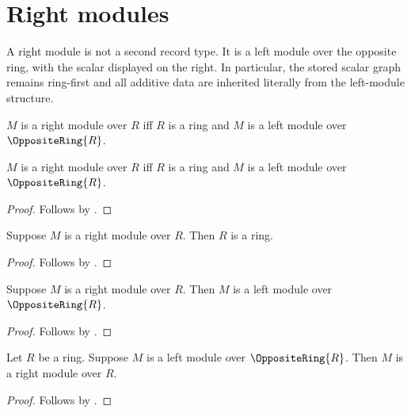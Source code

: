 


\section{Right modules}

A right module is not a second record type.  It is a left module over the
opposite ring, with the scalar displayed on the right.  In particular, the
stored scalar graph remains ring-first and all additive data are inherited
literally from the left-module structure.

\begin{definition}\label{right_module}
    $M$ is a right module over $R$ iff
        $R$ is a ring and
        $M$ is a left module over $\OppositeRing{R}$.
\end{definition}

\begin{proposition}\label{right_module_iff}
    $M$ is a right module over $R$ iff
        $R$ is a ring and
        $M$ is a left module over $\OppositeRing{R}$.
\end{proposition}
\begin{proof}
    Follows by .
\end{proof}

\begin{proposition}\label{right_module_ring}
    Suppose $M$ is a right module over $R$.
    Then $R$ is a ring.
\end{proposition}
\begin{proof}
    Follows by .
\end{proof}

\begin{proposition}\label{right_module_is_left_module_over_opposite}
    Suppose $M$ is a right module over $R$.
    Then $M$ is a left module over $\OppositeRing{R}$.
\end{proposition}
\begin{proof}
    Follows by .
\end{proof}

\begin{proposition}\label{left_module_over_opposite_is_right_module}
    Let $R$ be a ring.
    Suppose $M$ is a left module over $\OppositeRing{R}$.
    Then $M$ is a right module over $R$.
\end{proposition}
\begin{proof}
    Follows by .
\end{proof}

